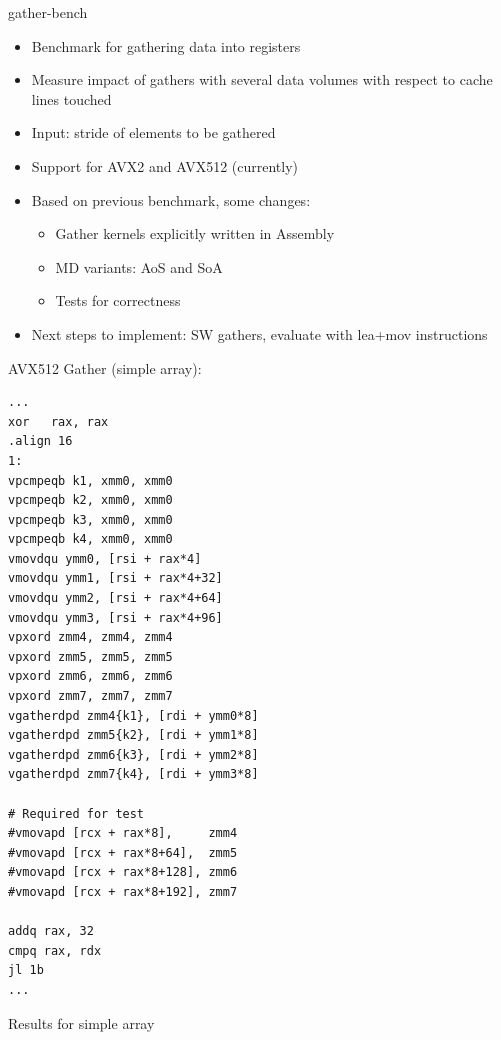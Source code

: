 \documentclass[aspectratio=169,t]{beamer}
\begin{document}
  \begin{frame}[fragile]{gather-bench}
    \begin{itemize}
      \item Benchmark for gathering data into registers
      \item Measure impact of gathers with several data volumes with respect to cache lines touched
      \item Input: stride of elements to be gathered
      \item Support for AVX2 and AVX512 (currently)
      \item Based on previous benchmark, some changes:
      \begin{itemize}
        \item Gather kernels explicitly written in Assembly
        \item MD variants: AoS and SoA
        \item Tests for correctness
      \end{itemize}
      \item Next steps to implement: SW gathers, evaluate with lea+mov instructions
    \end{itemize}
  \end{frame}

  \begin{frame}[fragile]{AVX512 Gather (simple array):}
    \vspace{-17.5pt}
    \begin{lstlisting}[language={[x64]Assembler},basicstyle=\tt\tiny]
...
xor   rax, rax
.align 16
1:
vpcmpeqb k1, xmm0, xmm0
vpcmpeqb k2, xmm0, xmm0
vpcmpeqb k3, xmm0, xmm0
vpcmpeqb k4, xmm0, xmm0
vmovdqu ymm0, [rsi + rax*4]
vmovdqu ymm1, [rsi + rax*4+32]
vmovdqu ymm2, [rsi + rax*4+64]
vmovdqu ymm3, [rsi + rax*4+96]
vpxord zmm4, zmm4, zmm4
vpxord zmm5, zmm5, zmm5
vpxord zmm6, zmm6, zmm6
vpxord zmm7, zmm7, zmm7
vgatherdpd zmm4{k1}, [rdi + ymm0*8]
vgatherdpd zmm5{k2}, [rdi + ymm1*8]
vgatherdpd zmm6{k3}, [rdi + ymm2*8]
vgatherdpd zmm7{k4}, [rdi + ymm3*8]

# Required for test
#vmovapd [rcx + rax*8],     zmm4
#vmovapd [rcx + rax*8+64],  zmm5
#vmovapd [rcx + rax*8+128], zmm6
#vmovapd [rcx + rax*8+192], zmm7

addq rax, 32
cmpq rax, rdx
jl 1b
...
    \end{lstlisting}
  \end{frame}

  \begin{frame}[fragile]{Results for simple array}
  \end{frame}
\end{document}
